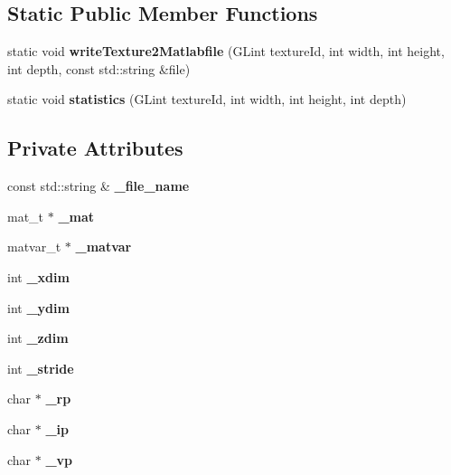 \subsection*{Static Public Member Functions}
\begin{DoxyCompactItemize}
\item 
static void {\bfseries write\-Texture2\-Matlabfile} (G\-Lint texture\-Id, int width, int height, int depth, const std\-::string \&file)\label{classSoundfieldViewer_1_1MatlabFileAdapter_afa012fa37c4e4fda147e624b5394f0a5}

\item 
static void {\bfseries statistics} (G\-Lint texture\-Id, int width, int height, int depth)\label{classSoundfieldViewer_1_1MatlabFileAdapter_aaf50f7c14b7d600ba54238e1c8cdbab0}

\end{DoxyCompactItemize}
\subsection*{Private Attributes}
\begin{DoxyCompactItemize}
\item 
const std\-::string \& {\bfseries \-\_\-file\-\_\-name}\label{classSoundfieldViewer_1_1MatlabFileAdapter_aa45e57567ce66d562cd630745987d803}

\item 
mat\-\_\-t $\ast$ {\bfseries \-\_\-mat}\label{classSoundfieldViewer_1_1MatlabFileAdapter_ae0f3cf6ba4a67b4ab7d377d2dddd3756}

\item 
matvar\-\_\-t $\ast$ {\bfseries \-\_\-matvar}\label{classSoundfieldViewer_1_1MatlabFileAdapter_a48f7e3b6cbbad4f9b00e31738f4f52dc}

\item 
int {\bfseries \-\_\-xdim}\label{classSoundfieldViewer_1_1MatlabFileAdapter_ad64799f62c8a250d446259ba2775bacd}

\item 
int {\bfseries \-\_\-ydim}\label{classSoundfieldViewer_1_1MatlabFileAdapter_a032d6e92bbd74dda4c7c566ac2784f91}

\item 
int {\bfseries \-\_\-zdim}\label{classSoundfieldViewer_1_1MatlabFileAdapter_af033cb6dd6ccdc4f3ef97795e363c2d1}

\item 
int {\bfseries \-\_\-stride}\label{classSoundfieldViewer_1_1MatlabFileAdapter_a4067f73493ad0b8a3ab6b573c27d0f68}

\item 
char $\ast$ {\bfseries \-\_\-rp}\label{classSoundfieldViewer_1_1MatlabFileAdapter_a935f50aab7837a33732ee19331ee85bc}

\item 
char $\ast$ {\bfseries \-\_\-ip}\label{classSoundfieldViewer_1_1MatlabFileAdapter_a4411fe3676806f84318349f960b653c2}

\item 
char $\ast$ {\bfseries \-\_\-vp}\label{classSoundfieldViewer_1_1MatlabFileAdapter_a4a522f639ae25cebdd1aa32adb8bd682}

\end{DoxyCompactItemize}



